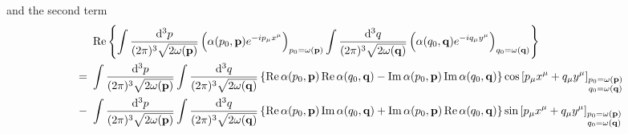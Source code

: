 \begin{lemma}
\begin{equation*}
	\end{equation*}
	and the second term
	\begin{equation*}
		\begin{split}
			&\
			\operatorname{\operatorname{Re}}\left\{
				\int\frac{\dd[3]{p}}{(2\pi)^3\sqrt{2\omega(\vb{p})}}
				\left(
					\alpha(p_0,\vb{p})
					e^{-ip_\mu x^\mu}
				\right)_{p_0=\omega(\vb{p})}
				\int\frac{\dd[3]{q}}{(2\pi)^3\sqrt{2\omega(\vb{q})}}
				\left(
					\alpha(q_0,\vb{q})
					e^{-iq_\mu y^\mu}
				\right)_{q_0=\omega(\vb{q})}			
			\right\}
			\\
			=&\
			\int\frac{\dd[3]{p}}{(2\pi)^3\sqrt{2\omega(\vb{p})}}
			\int\frac{\dd[3]{q}}{(2\pi)^3\sqrt{2\omega(\vb{q})}}
			\left\{
				\operatorname{\operatorname{Re}}\alpha(p_0,\vb{p})
				\operatorname{\operatorname{Re}}\alpha(q_0,\vb{q})
				-
				\operatorname{\operatorname{Im}}\alpha(p_0,\vb{p})
				\operatorname{\operatorname{Im}}\alpha(q_0,\vb{q})
			\right\}
			\cos\left[
				p_\mu x^\mu
				+
				q_\mu y^\mu
			\right]_{\substack{p_0=\omega(\vb{p})\\q_0=\omega(\vb{q})}}
			\\
			-&\
			\int\frac{\dd[3]{p}}{(2\pi)^3\sqrt{2\omega(\vb{p})}}
			\int\frac{\dd[3]{q}}{(2\pi)^3\sqrt{2\omega(\vb{q})}}
			\left\{
				\operatorname{\operatorname{Re}}\alpha(p_0,\vb{p})
				\operatorname{\operatorname{Im}}\alpha(q_0,\vb{q})
				+
				\operatorname{\operatorname{Im}}\alpha(p_0,\vb{p})
				\operatorname{\operatorname{Re}}\alpha(q_0,\vb{q})
			\right\}
			\sin\left[
				p_\mu x^\mu
				+
				q_\mu y^\mu
			\right]_{\substack{p_0=\omega(\vb{p})\\q_0=\omega(\vb{q})}}
		\end{split}
	\end{equation*}
\end{lemma}
